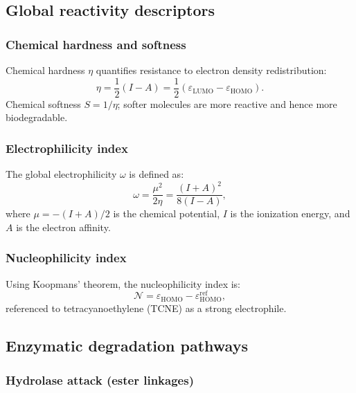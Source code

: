 \documentclass[11pt,a4paper]{article}
\begin{document}
\subsection{Global reactivity descriptors}

\subsubsection{Chemical hardness and softness}

Chemical hardness $\eta$ quantifies resistance to electron density redistribution:
\begin{equation}
\eta = \frac{1}{2}(I - A) = \frac{1}{2}(\varepsilon_{\mathrm{LUMO}} - \varepsilon_{\mathrm{HOMO}}).
\end{equation}
Chemical softness $S = 1/\eta$; softer molecules are more reactive and hence more biodegradable.

\subsubsection{Electrophilicity index}

The global electrophilicity $\omega$ is defined as:
\begin{equation}
\omega = \frac{\mu^2}{2\eta} = \frac{(I + A)^2}{8(I - A)},
\end{equation}
where $\mu = -(I + A)/2$ is the chemical potential, $I$ is the ionization energy, and $A$ is the electron affinity.

\subsubsection{Nucleophilicity index}

Using Koopmans' theorem, the nucleophilicity index is:
\begin{equation}
\mathcal{N} = \varepsilon_{\mathrm{HOMO}} - \varepsilon_{\mathrm{HOMO}}^{\mathrm{ref}},
\end{equation}
referenced to tetracyanoethylene (TCNE) as a strong electrophile.

\subsection{Enzymatic degradation pathways}

\subsubsection{Hydrolase attack (ester linkages)}
\end{document}
